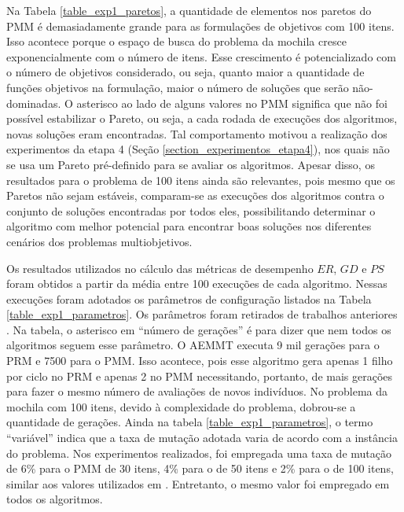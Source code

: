 Na Tabela \ref{table_exp1_paretos}, a quantidade de elementos nos paretos do PMM é demasiadamente grande para as formulações de objetivos com 100 itens. Isso acontece porque o espaço de busca do problema da mochila cresce exponencialmente com o número de itens. Esse crescimento é potencializado com o número de objetivos considerado, ou seja, quanto maior a quantidade de funções objetivos na formulação, maior o número de soluções que serão não-dominadas. O asterisco ao lado de alguns valores no PMM significa que não foi possível estabilizar o Pareto, ou seja, a cada rodada de execuções dos algoritmos, novas soluções eram encontradas. Tal comportamento motivou a realização dos experimentos da etapa 4 (Seção \ref{section_experimentos_etapa4}), nos quais não se usa um Pareto pré-definido para se avaliar os algoritmos. Apesar disso, os resultados para o problema de 100 itens ainda são relevantes, pois mesmo que os Paretos não sejam estáveis, comparam-se as execuções dos algoritmos contra o conjunto de soluções encontradas por todos eles, possibilitando determinar o algoritmo com melhor potencial para encontrar boas soluções nos diferentes cenários dos problemas multiobjetivos.

Os resultados utilizados no cálculo das métricas de desempenho $ER$, $GD$ e $PS$ foram obtidos a partir da média entre 100 execuções de cada algoritmo. Nessas execuções foram adotados os parâmetros de configuração listados na Tabela \ref{table_exp1_parametros}. Os parâmetros foram retirados de trabalhos anteriores \cite{LafetaThesis, Brasil2013, Ishibuchi2015}. Na tabela, o asterisco em ``número de gerações'' é para dizer que nem todos os algoritmos seguem esse parâmetro. O AEMMT executa 9 mil gerações para o PRM e 7500 para o PMM. Isso acontece, pois esse algoritmo gera apenas 1 filho por ciclo no PRM e apenas 2 no PMM necessitando, portanto, de mais gerações para fazer o mesmo número de avaliações de novos indivíduos. No problema da mochila com 100 itens, devido à complexidade do problema, dobrou-se a quantidade de gerações. Ainda na tabela \ref{table_exp1_parametros}, o termo ``variável'' indica que a taxa de mutação adotada varia de acordo com a instância do problema. Nos experimentos realizados, foi empregada uma taxa de mutação de 6\% para o PMM de 30 itens, 4\% para o de 50 itens e 2\% para o de 100 itens, similar aos valores utilizados em \cite{Ishibuchi2015}. Entretanto, o mesmo valor foi empregado em todos os algoritmos.

